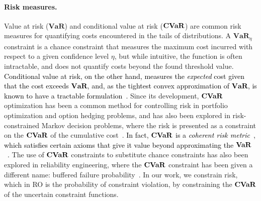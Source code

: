 \documentclass[11pt]{article}
\newcommand{\RC}[1]{\textcolor{black}{#1}}
\begin{document}
\paragraph{Risk measures.}
Value at risk ($\mathbf{VaR}$) and conditional value at risk ($\mathop{\bf CVaR}$) are common risk measures for quantifying costs encountered in the tails of distributions.
A $\mathbf{VaR}_\eta$ constraint is a chance constraint that measures the maximum cost incurred with respect to a given confidence level $\eta$, but while intuitive, the function is often intractable, and does not quantify costs beyond the found threshold value.
\RC{Conditional value at risk, on the other hand, measures the {\it expected} cost given that the cost exceeds $\mathbf{VaR}$, and, as the tightest convex approximation of $\mathbf{VaR}$, is known to have a tractable formulation~\citep{cvaropt,cvar}. }
Since its development, $\mathop{\bf CVaR}$ optimization has been a common method for controlling risk in portfolio optimization and option hedging problems, and has also been explored in risk-constrained Markov decision problems, where the risk is presented as a constraint on the $\mathop{\bf CVaR}$ of the cumulative cost~\citep{cvar_markov}.
\RC{In fact, $\mathop{\bf CVaR}$ is a {\it coherent risk metric}~\citep{coherentrisk}, which satisfies certain axioms that give it value beyond approximating the $\mathop{\bf VaR}$~\citep{cvar_var}.} 
The use of $\mathop{\bf CVaR}$ constraints to substitute chance constraints has also been explored in reliability engineering, where the $\mathop{\bf CVaR}$ constraint has been given a different name: buffered failure probability~\citep{buffered}.
In our work, we constrain risk, which in \gls{RO} is the probability of constraint violation, by constraining the $\mathop{\bf CVaR}$ of the uncertain constraint functions.
\end{document}
